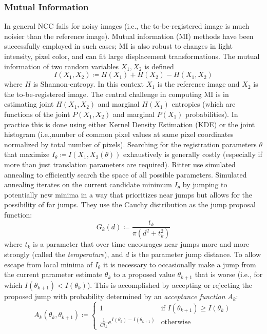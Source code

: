 \subsubsection{Mutual Information}

In general NCC fails for noisy images (i.e., the to-be-registered image is much noisier than the reference image).
%
Mutual information (MI) methods have been successfully employed in such cases; MI is also robust to changes in light intensity, pixel color, and can fit large displacement transformations.
%
The mutual information of two random variables \(X_1, X_2\) is defined
\[
	I (X_1,X_2) \coloneqq H (X_1)+H (X_2)-H (X_1,X_2)
\]
where \(H\) is Shannon-entropy.
%
In this context \(X_1\) is the reference image and \(X_2\) is the to-be-registered image.
%
The central challenge in computing MI is in estimating joint \(H(X_1,X_2)\) and marginal \(H(X_1)\) entropies (which are functions of the joint \(P(X_1,X_2)\) and marginal \(P(X_1)\) probabilities).
%
In practice this is done using either Kernel Density Estimation (KDE) or the joint histogram (i.e.,number of common pixel values at same pixel coordinates normalized by total number of pixels).
%
Searching for the registration parameters \(\theta\) that maximize \(I_{\theta} \coloneqq I(X_1,X_2(\theta))\) exhaustively is generally costly (especially if more than just translation parameters are required).
%
Ritter \etal \cite{ritter1999} use simulated annealing to efficiently search the space of all possible parameters.
%
Simulated annealing iterates on the current candidate minimum \(I_{\theta}\) by jumping to potentially new minima in a way that prioritizes near jumps but allows for the possibility of far jumps.
%
They use the Cauchy distribution as the jump proposal function:
\[
	G_k(d) \coloneqq \frac{t_k}{\pi \left( d^2 + t_k^2 \right)}
\]
where \(t_k\) is a parameter that over time encourages near jumps more and more strongly (called the \textit{temperature}), and \(d\) is the parameter jump distance.
%
To allow escape from local minima of \(I_{\theta}\) it is necessary to occasionally make a jump from the current parameter estimate \(\theta_k\) to a proposed value \(\theta_{k+1}\) that is worse (i.e., for which \(I(\theta_{k+1}) < I(\theta_{k}) \)).
%
This is accomplished by accepting or rejecting the proposed jump with probability determined by an \textit{acceptance function} \(A_k\):
\[
	A_k(\theta_{k}, \theta_{k+1}) \coloneqq \begin{cases}
		1                                                  & \text{if } I(\theta_{k+1}) \geq I(\theta_{k}) \\
		\frac{1}{C t_k}e^{I(\theta_{k}) - I(\theta_{k+1})} & \text{otherwise}
	\end{cases}
\]

